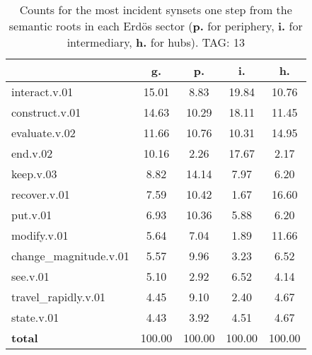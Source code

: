 \begin{table}[h!]
\begin{center}
\begin{tabular}{| l || c | c | c | c |}\hline
 & {\bf g.} & {\bf p.} & {\bf i.} & {\bf h.} \\\hline\hline
interact.v.01 & 15.01  & 8.83  & 19.84  & 10.76 \\\hline
construct.v.01 & 14.63  & 10.29  & 18.11  & 11.45 \\\hline
evaluate.v.02 & 11.66  & 10.76  & 10.31  & 14.95 \\\hline
end.v.02 & 10.16  & 2.26  & 17.67  & 2.17 \\\hline
keep.v.03 & 8.82  & 14.14  & 7.97  & 6.20 \\\hline
recover.v.01 & 7.59  & 10.42  & 1.67  & 16.60 \\\hline
put.v.01 & 6.93  & 10.36  & 5.88  & 6.20 \\\hline
modify.v.01 & 5.64  & 7.04  & 1.89  & 11.66 \\\hline
change\_magnitude.v.01 & 5.57  & 9.96  & 3.23  & 6.52 \\\hline
see.v.01 & 5.10  & 2.92  & 6.52  & 4.14 \\\hline
travel\_rapidly.v.01 & 4.45  & 9.10  & 2.40  & 4.67 \\\hline
state.v.01 & 4.43  & 3.92  & 4.51  & 4.67 \\\hline\hline
{{\bf total}} & 100.00  & 100.00  & 100.00  & 100.00 \\\hline
\end{tabular}
\caption{Counts for the most incident synsets one step from the semantic roots in each Erd\"os sector ({\bf p.} for periphery, {\bf i.} for intermediary, {\bf h.} for hubs). TAG: 13}
\end{center}
\end{table}